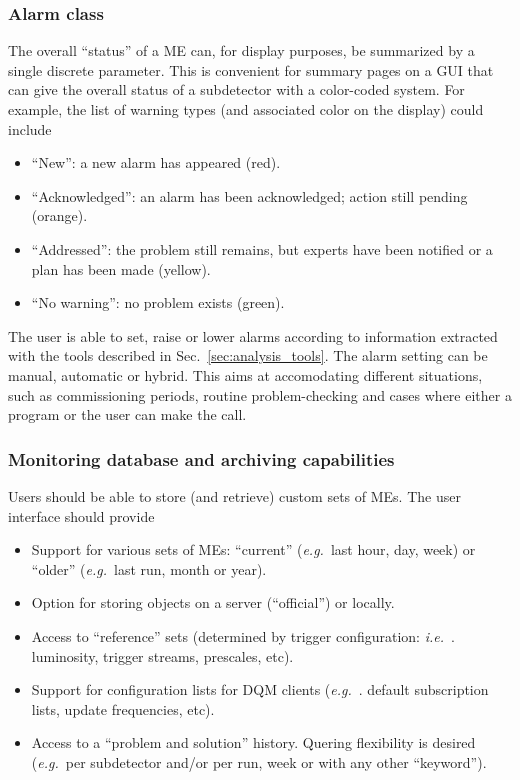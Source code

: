 \documentclass{cmspaper}
\newcommand {\ie}{\mbox{\sl i.e. }}     %
\newcommand {\eg}{\mbox{\sl e.g. }}     %
\begin{document}
\subsubsection{Alarm class}
\label{sec:alarm_class}
The overall ``status'' of a ME can, for display purposes, be
summarized by a single discrete parameter. This is convenient for
summary pages on a GUI that can give the overall status of a
subdetector with a color-coded system. For example, the list of
warning types (and associated color on the display) could include
\begin{itemize}
\item{``New'': a new alarm has appeared (red).}
\item{``Acknowledged'': an alarm has been acknowledged; action still pending
(orange).}
\item{``Addressed'': the problem still remains, but experts have been
notified or a plan has been made (yellow).}
\item{``No warning'': no problem exists (green).}
\end{itemize}
%
The user is able to set, raise or lower alarms according to
information extracted with the tools described in
Sec.~\ref{sec:analysis_tools}. The alarm setting can be manual,
automatic or hybrid. This aims at accomodating different situations,
such as commissioning periods, routine problem-checking and cases
where either a program or the user can make the call.
%
%
\subsubsection{Monitoring database and archiving capabilities}
\label{sec:monitoring_database}
Users should be able to store (and retrieve) custom sets of MEs. The
user interface should provide
\begin{itemize}
\item{Support for various sets of MEs: ``current'' (\eg last
hour, day, week) or ``older'' (\eg last run, month or year).} 
\item{Option for storing objects on a server (``official'') or
locally.}
\item{Access to ``reference'' sets (determined by trigger configuration:
\ie. luminosity, trigger streams, prescales, etc).}
\item{Support for configuration lists for DQM clients (\eg. default
subscription lists, update frequencies, etc).}
\item{Access to a ``problem and solution'' history. Quering flexibility is
desired (\eg per subdetector and/or per run, week or with
any other ``keyword'').}
\end{itemize}
%
%
\end{document}
